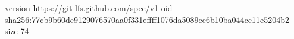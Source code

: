 version https://git-lfs.github.com/spec/v1
oid sha256:77cb9b60de9129076570aa0f331effff1076da5089ee6b10ba044cc11e5204b2
size 74
